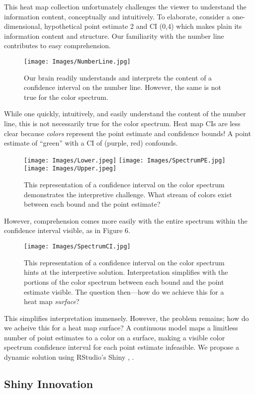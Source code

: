 This heat map collection unfortunately challenges the viewer to understand the information content, conceptually and intuitively. To elaborate, consider a one-dimensional, hypothetical point estimate 2 and CI (0,4) which makes plain its information content and structure. Our familiarity with the number line contributes to easy comprehension.
  \begin{figure}[H]
  \centering
	\texttt{[image: Images/NumberLine.jpg]}
	\caption{Our brain readily understands and interprets the content of a confidence interval on the number line. However, the same is not true for the color spectrum.}
	\end{figure}
While one quickly, intuitively, and easily understand the content of the number line, this is not necessarily true for the color spectrum. Heat map CIs are less clear because {\it colors} represent the point estimate and confidence bounds! A point estimate of ``green'' with a CI of (purple, red) confounds.
  \begin{figure}[H]
  \centering
	\texttt{[image: Images/Lower.jpeg]}
	\texttt{[image: Images/SpectrumPE.jpg]}
	\texttt{[image: Images/Upper.jpeg]}

	\caption{This representation of a confidence interval on the color spectrum demonstrates the interpretive challenge. What stream of colors exist between each bound and the point estimate?}
	\end{figure}

However, comprehension comes more easily with the entire spectrum within the confidence interval visible, as in Figure 6.
  \begin{figure}[H]
  \centering
	\texttt{[image: Images/SpectrumCI.jpg]}
	\caption{This representation of a confidence interval on the color spectrum hints at the interpretive solution. Interpretation simplifies with the portions of the color spectrum between each bound and the point estimate visible. The question then---how do we achieve this for a heat map {\it surface}?}
	\end{figure}
This simplifies interpretation immensely. However, the problem remains; how do we acheive this for a heat map surface? A continuous model maps a limitless number of point estimates to a color on a surface, making a visible color spectrum confidence interval for each point estimate infeasible. We propose a dynamic solution using RStudio's Shiny \citep{Shiny}, \citep{RStudio}.

\subsection{Shiny Innovation}

